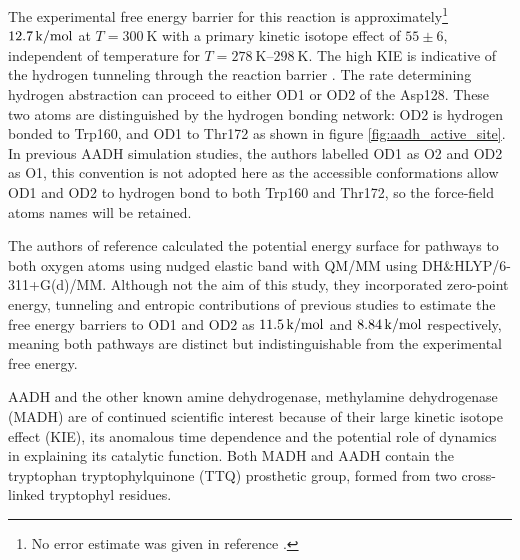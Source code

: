 The experimental free energy barrier for this reaction is approximately\footnote{No error estimate was given in reference \cite{masgrauAtomicDescriptionEnzyme2006}.} $ \SI{12.7}{\kilo\cal\per\mol}$ at $T=\SI{300}{\kelvin}$ with a primary kinetic isotope effect of $55 \pm 6$, independent of temperature\cite{masgrauAtomicDescriptionEnzyme2006} for $T =\SIrange[range-phrase=--]{278}{298}{\kelvin}$. The high KIE is indicative of the hydrogen tunneling through the reaction barrier \cite{masgrauAtomicDescriptionEnzyme2006,kohenEnzymeCatalysisClassical1998,antoniouInternalEnzymeMotions2001,antoniouLargeKineticIsotope1997,allemannQuantumTunnellingEnzymecatalysed2009}. The rate determining hydrogen abstraction can proceed to either OD1 or OD2 of the Asp128. These two atoms are distinguished by the hydrogen bonding network: OD2 is hydrogen bonded to Trp160, and OD1 to Thr172 as shown in figure \ref{fig:aadh_active_site}. In previous AADH simulation studies\cite{masgrauAtomicDescriptionEnzyme2006,masgrauTunnelingClassicalPaths2007,ranaghanInitioQMMM2017}, the authors labelled OD1 as O2 and OD2 as O1, this convention is not adopted here as the accessible conformations allow OD1 and OD2 to hydrogen bond to both Trp160 and Thr172, so the force-field atoms names will be retained. 

The authors of reference \cite{ranaghanInitioQMMM2017} calculated the potential energy surface for pathways to both oxygen atoms using nudged elastic band with QM/MM using DH\&HLYP/6-311+G(d)/MM. Although not the aim of this study, they incorporated zero-point energy, tunneling and entropic contributions of previous studies\cite{masgrauAtomicDescriptionEnzyme2006,masgrauTunnelingClassicalPaths2007} to estimate the free energy barriers to OD1 and OD2 as $\SI{11.5}{\kilo\cal\per\mol}$ and $\SI{8.84}{\kilo\cal\per\mol}$ respectively, meaning both pathways are distinct but indistinguishable from the experimental free energy.  

AADH and the other known amine dehydrogenase, methylamine dehydrogenase (MADH) are of continued scientific interest because of their large kinetic isotope effect (KIE)\cite{hyunUnusuallyLargeIsotope1995a,basranImportanceBarrierShape2001a,basranEnzymaticHTransferRequires1999}, its anomalous time dependence\cite{glowackiProteinDynamicsEnzyme2012a, glowackiTakingOckhamRazor2012b} and the potential role of dynamics in explaining its catalytic function\cite{mcgeaghProteinDynamicsEnzyme2011,glowackiProteinDynamicsEnzyme2012a,glowackiTakingOckhamRazor2012b}. Both MADH and AADH contain the tryptophan tryptophylquinone (TTQ) prosthetic group\cite{govindarajAromaticAmineDehydrogenase1994a,McIntire817}, formed from two cross-linked tryptophyl residues.


